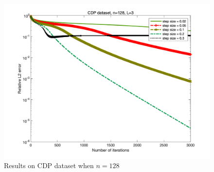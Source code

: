 \documentclass{article}
\begin{document}
\begin{figure}
\begin{minipage}{0.33\linewidth}
		\includegraphics[width=1\linewidth]{./fig/CDP+13.png}
		\caption{$L=12$}
	\end{minipage}
	\caption*{Results on CDP dataset when $n=128$}
\end{figure}
\end{document}
